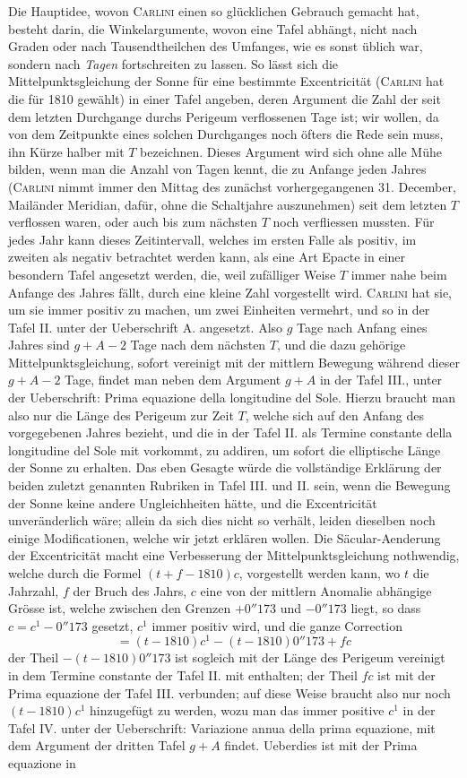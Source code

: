 Die Hauptidee, wovon \textsc{Carlini} einen so glücklichen Gebrauch gemacht hat, besteht darin, die Winkelargumente, wovon eine Tafel abhängt, nicht nach Graden oder nach Tausendtheilchen des Umfanges, wie es sonst üblich war, sondern nach \emph{Tagen} fortschreiten zu lassen. So lässt sich die Mittelpunktsgleichung der Sonne für eine bestimmte Excentricität (\textsc{Carlini} hat die für 1810 gewählt) in einer Tafel angeben, deren Argument die Zahl der seit dem letzten Durchgange durchs Perigeum verflossenen Tage ist; wir wollen, da von dem Zeitpunkte eines solchen Durchganges noch öfters die Rede sein muss, ihn Kürze halber mit $T$ bezeichnen. Dieses Argument wird sich ohne alle Mühe bilden, wenn man die Anzahl von Tagen kennt, die zu Anfange jeden Jahres (\textsc{Carlini} nimmt immer den Mittag des zunächst vorhergegangenen 31. December, Mailänder Meridian, dafür, ohne die Schaltjahre auszunehmen) seit dem letzten $T$ verflossen waren, oder auch bis zum nächsten $T$ noch verfliessen mussten. Für jedes Jahr kann dieses Zeitintervall, welches im ersten Falle als positiv, im zweiten als negativ betrachtet werden kann, als eine Art Epacte in einer besondern Tafel angesetzt werden, die, weil zufälliger Weise $T$ immer nahe beim Anfange des Jahres fällt, durch eine kleine Zahl vorgestellt wird. \textsc{Carlini} hat sie, um sie immer positiv zu machen, um zwei Einheiten vermehrt, und so in der Tafel II. unter der Ueberschrift A. angesetzt. Also $g$ Tage nach Anfang eines Jahres sind $g+A-2$ Tage nach dem nächsten $T$, und die dazu gehörige Mittelpunktsgleichung, sofort vereinigt mit der mittlern Bewegung während dieser $g+A-2$ Tage, findet man neben dem Argument $g+A$ in der Tafel III., unter der Ueberschrift: Prima equazione della longitudine del Sole. Hierzu braucht man also nur die Länge des Perigeum zur Zeit $T$, welche sich auf den Anfang des vorgegebenen Jahres bezieht, und die in der Tafel II. als Termine constante della longitudine del Sole mit vorkommt, zu addiren, um sofort die elliptische Länge der Sonne zu erhalten. Das eben Gesagte würde die vollständige Erklärung der beiden zuletzt genannten Rubriken in Tafel III. und II. sein, wenn die Bewegung der Sonne keine andere Ungleichheiten hätte, und die Excentricität unveränderlich wäre; allein da sich dies nicht so verhält, leiden dieselben noch einige Modificationen, welche wir jetzt erklären wollen. Die Säcular-Aenderung der Excentricität macht eine Verbesserung der Mittelpunktsgleichung nothwendig, welche durch die Formel $(t+f-1810)c$, vorgestellt werden kann, wo $t$ die Jahrzahl, $f$ der Bruch des Jahrs, $c$ eine von der mittlern Anomalie abhängige Grösse ist, welche zwischen den Grenzen $+0''173$ und $-0''173$ liegt, so dass $c = c^1 - 0''173$ gesetzt, $c^1$ immer positiv wird, und die ganze Correction \[ = (t-1810)c^1 - (t-1810)0''173 + fc \] der Theil $-(t-1810)0''173$ ist sogleich mit der Länge des Perigeum vereinigt in dem Termine constante der Tafel II. mit enthalten; der Theil $fc$ ist mit der Prima equazione der Tafel III. verbunden; auf diese Weise braucht also nur noch $(t-1810)c^1$ hinzugefügt zu werden, wozu man das immer positive $c^1$ in der Tafel IV. unter der Ueberschrift: Variazione annua della prima equazione, mit dem Argument der dritten Tafel $g+A$ findet. Ueberdies ist mit der Prima equazione in 